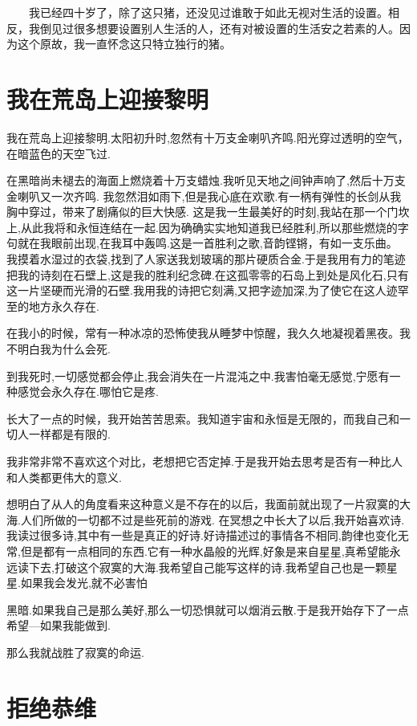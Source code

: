 　　我已经四十岁了，除了这只猪，还没见过谁敢于如此无视对生活的设置。相反，我倒见过很多想要设置别人生活的人，还有对被设置的生活安之若素的人。因为这个原故，我一直怀念这只特立独行的猪。

\chapter{我在荒岛上迎接黎明}

我在荒岛上迎接黎明.太阳初升时,忽然有十万支金喇叭齐鸣.阳光穿过透明的空气，在暗蓝色的天空飞过. 

在黑暗尚未褪去的海面上燃烧着十万支蜡烛.我听见天地之间钟声响了,然后十万支金喇叭又一次齐鸣. 我忽然泪如雨下,但是我心底在欢歌.有一柄有弹性的长剑从我胸中穿过，带来了剧痛似的巨大快感. 这是我一生最美好的时刻,我站在那一个门坎上,从此我将和永恒连结在一起.因为确确实实地知道我已经胜利,所以那些燃烧的字句就在我眼前出现,在我耳中轰鸣.这是一首胜利之歌,音韵铿锵，有如一支乐曲。 我摸着水湿过的衣袋,找到了人家送我划玻璃的那片硬质合金.于是我用有力的笔迹把我的诗刻在石壁上,这是我的胜利纪念碑.在这孤零零的石岛上到处是风化石,只有这一片坚硬而光滑的石壁.我用我的诗把它刻满,又把字迹加深,为了使它在这人迹罕至的地方永久存在. 

在我小的时候，常有一种冰凉的恐怖使我从睡梦中惊醒，我久久地凝视着黑夜。我不明白我为什么会死. 

到我死时,一切感觉都会停止,我会消失在一片混沌之中.我害怕毫无感觉,宁愿有一种感觉会永久存在.哪怕它是疼. 

长大了一点的时候，我开始苦苦思索。我知道宇宙和永恒是无限的，而我自己和一切人一样都是有限的. 

我非常非常不喜欢这个对比，老想把它否定掉.于是我开始去思考是否有一种比人和人类都更伟大的意义. 

想明白了从人的角度看来这种意义是不存在的以后，我面前就出现了一片寂寞的大海.人们所做的一切都不过是些死前的游戏. 在冥想之中长大了以后,我开始喜欢诗.我读过很多诗,其中有一些是真正的好诗.好诗描述过的事情各不相同,韵律也变化无常,但是都有一点相同的东西.它有一种水晶般的光辉,好象是来自星星,真希望能永远读下去,打破这个寂寞的大海.我希望自己能写这样的诗.我希望自己也是一颗星星.如果我会发光,就不必害怕 

黑暗.如果我自己是那么美好,那么一切恐惧就可以烟消云散.于是我开始存下了一点希望---如果我能做到. 

那么我就战胜了寂寞的命运.

\chapter{拒绝恭维}

